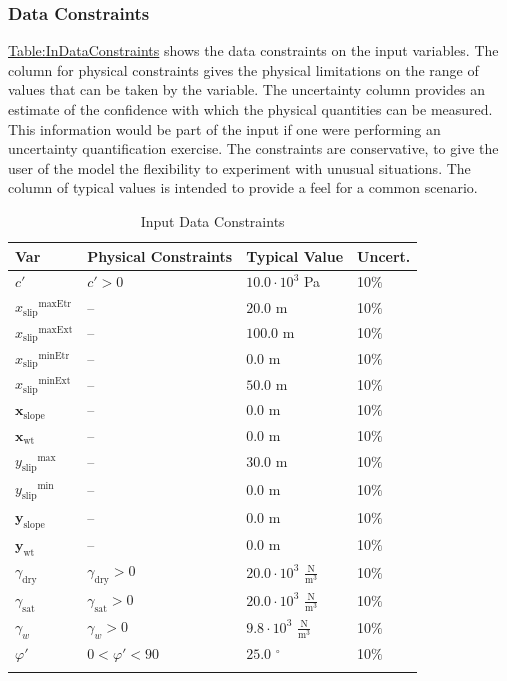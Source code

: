 \documentclass[12pt]{article}
\begin{document}
\subsubsection{Data Constraints}
\label{Sec:DataConstraints}
\hyperref[Table:InDataConstraints]{Table:InDataConstraints} shows the data constraints on the input variables. The column for physical constraints gives the physical limitations on the range of values that can be taken by the variable. The uncertainty column provides an estimate of the confidence with which the physical quantities can be measured. This information would be part of the input if one were performing an uncertainty quantification exercise. The constraints are conservative, to give the user of the model the flexibility to experiment with unusual situations. The column of typical values is intended to provide a feel for a common scenario.

\begin{longtable}{l l l l}
\toprule
\textbf{Var} & \textbf{Physical Constraints} & \textbf{Typical Value} & \textbf{Uncert.}
\\
\midrule
\endhead
$c'$ & $c'>0$ & $10.0\cdot{}10^{3}$ Pa & 10$\%$
\\
${{x_{\text{slip}}}^{\text{maxEtr}}}$ & -- & $20.0$ m & 10$\%$
\\
${{x_{\text{slip}}}^{\text{maxExt}}}$ & -- & $100.0$ m & 10$\%$
\\
${{x_{\text{slip}}}^{\text{minEtr}}}$ & -- & $0.0$ m & 10$\%$
\\
${{x_{\text{slip}}}^{\text{minExt}}}$ & -- & $50.0$ m & 10$\%$
\\
${\mathbf{x}_{\text{slope}}}$ & -- & $0.0$ m & 10$\%$
\\
${\mathbf{x}_{\text{wt}}}$ & -- & $0.0$ m & 10$\%$
\\
${{y_{\text{slip}}}^{\text{max}}}$ & -- & $30.0$ m & 10$\%$
\\
${{y_{\text{slip}}}^{\text{min}}}$ & -- & $0.0$ m & 10$\%$
\\
${\mathbf{y}_{\text{slope}}}$ & -- & $0.0$ m & 10$\%$
\\
${\mathbf{y}_{\text{wt}}}$ & -- & $0.0$ m & 10$\%$
\\
${γ_{\text{dry}}}$ & ${γ_{\text{dry}}}>0$ & $20.0\cdot{}10^{3}$ $\frac{\text{N}}{\text{m}^{3}}$ & 10$\%$
\\
${γ_{\text{sat}}}$ & ${γ_{\text{sat}}}>0$ & $20.0\cdot{}10^{3}$ $\frac{\text{N}}{\text{m}^{3}}$ & 10$\%$
\\
${γ_{w}}$ & ${γ_{w}}>0$ & $9.8\cdot{}10^{3}$ $\frac{\text{N}}{\text{m}^{3}}$ & 10$\%$
\\
$φ'$ & $0<φ'<90$ & $25.0$ ${}^{\circ}$ & 10$\%$
\\
\bottomrule
\caption{Input Data Constraints}
\label{Table:InDataConstraints}
\end{longtable}
\end{document}

